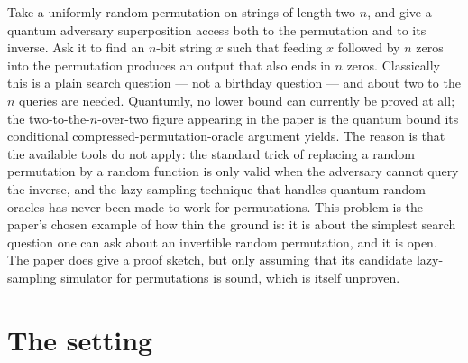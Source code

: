 \documentclass{aicr-conjecture}
\begin{document}

\vspace{0.4em}

\begin{informalconjecture}
Take a uniformly random permutation on strings of length two $n$, and
give a quantum adversary superposition access both to the permutation
and to its inverse. Ask it to find an $n$-bit string $x$ such that
feeding $x$ followed by $n$ zeros into the permutation produces an
output that also ends in $n$ zeros. Classically this is a plain search
question --- not a birthday question --- and about two to the $n$
queries are needed. Quantumly, no lower bound can currently be proved
at all; the two-to-the-$n$-over-two figure appearing in the paper is
the quantum bound its conditional compressed-permutation-oracle
argument yields. The reason is that the available tools do not apply:
the standard trick of replacing a random permutation by a random
function is only valid when the adversary cannot query the inverse,
and the lazy-sampling technique that handles quantum random oracles
has never been made to work for permutations. This problem is the
paper's chosen example of how thin the ground is: it is about the
simplest search question one can ask about an invertible random
permutation, and it is open. The paper does give a proof sketch, but
only assuming that its candidate lazy-sampling simulator for
permutations is sound, which is itself unproven.
\end{informalconjecture}

\section{The setting}\label{sec:setting}
\end{document}
